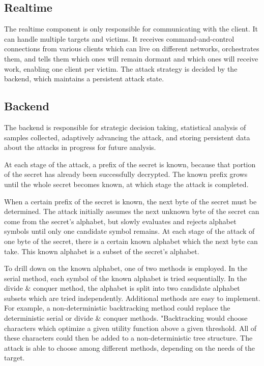 \documentclass[a4paper, 11 pt, conference]{article}
\begin{document}
\subsection{Realtime}
The realtime component is only responsible for communicating with the client. It can handle multiple targets and victims. It receives command-and-control connections from various clients which can live on different networks, orchestrates them, and tells them which ones will remain dormant and which ones will receive work, enabling one client per victim. The attack strategy is decided by the backend, which maintains a persistent attack state.

\subsection{Backend}
The backend is responsible for strategic decision taking, statistical analysis of samples collected, adaptively advancing the attack, and storing persistent data about the attacks in progress for future analysis.

At each stage of the attack, a prefix of the secret is known, because that portion of the secret has already been successfully decrypted. The known prefix grows until the whole secret becomes known, at which stage the attack is completed.

When a certain prefix of the secret is known, the next byte of the secret must be determined. The attack initially assumes the next unknown byte of the secret can come from the secret's alphabet, but slowly evaluates and rejects alphabet symbols until only one candidate symbol remains. At each stage of the attack of one byte of the secret, there is a certain known alphabet which the next byte can take. This known alphabet is a subset of the secret's alphabet.

To drill down on the known alphabet, one of two methods is employed. In the serial method, each symbol of the known alphabet is tried sequentially. In the divide \& conquer method, the alphabet is split into two candidate alphabet subsets which are tried independently. Additional methods are easy to implement. For example, a non-deterministic backtracking method could replace the deterministic serial or divide \& conquer methods. "Backtracking would choose characters which optimize a given utility function above a given threshold. All of these characters could then be added to a non-deterministic tree structure. The attack is able to choose among different methods, depending on the needs of the target.
\end{document}
